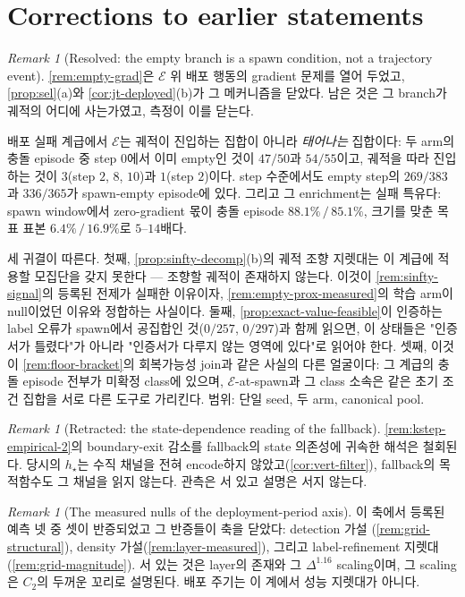 \documentclass[11pt]{article}
\theoremstyle{plain}
\theoremstyle{definition}
\theoremstyle{remark}
\newtheorem{remark}[theorem]{Remark}
\begin{document}
\section{Corrections to earlier statements}\label{sec:dt-corrections}

\begin{remark}[Resolved: the empty branch is a spawn condition, not a trajectory event]\label{rem:empty-resolved}
\cref{rem:empty-grad}은 $\mathcal E$ 위 배포 행동의 gradient 문제를 열어 두었고,
\cref{prop:sel}(a)와 \cref{cor:jt-deployed}(b)가 그 메커니즘을 닫았다. 남은 것은 그 branch가
궤적의 어디에 사는가였고, 측정이 이를 닫는다.

배포 실패 계급에서 $\mathcal E$는 궤적이 진입하는 집합이 아니라 \emph{태어나는} 집합이다: 두
arm의 충돌 episode 중 step $0$에서 이미 empty인 것이 $47/50$과 $54/55$이고, 궤적을 따라
진입하는 것이 $3$(step $2$, $8$, $10$)과 $1$(step $2$)이다. step 수준에서도 empty step의
$269/383$과 $336/365$가 spawn-empty episode에 있다. 그리고 그 enrichment는 실패 특유다:
spawn window에서 zero-gradient 몫이 충돌 episode $88.1\%\,/\,85.1\%$, 크기를 맞춘 목표 표본
$6.4\%\,/\,16.9\%$로 $5$--$14$배다.

세 귀결이 따른다. 첫째, \cref{prop:sinfty-decomp}(b)의 궤적 조향 지렛대는 이 계급에 적용할
모집단을 갖지 못한다 --- 조향할 궤적이 존재하지 않는다. 이것이 \cref{rem:sinfty-signal}의
등록된 전제가 실패한 이유이자, \cref{rem:empty-prox-measured}의 학습 arm이 null이었던 이유와
정합하는 사실이다. 둘째, \cref{prop:exact-value-feasible}이 인증하는 label 오류가 spawn에서
공집합인 것($0/257$, $0/297$)과 함께 읽으면, 이 상태들은 "인증서가 틀렸다"가 아니라
"인증서가 다루지 않는 영역에 있다"로 읽어야 한다. 셋째, 이것이 \cref{rem:floor-bracket}의
회복가능성 join과 같은 사실의 다른 얼굴이다: 그 계급의 충돌 episode 전부가 미확정 class에
있으며, $\mathcal E$-at-spawn과 그 class 소속은 같은 초기 조건 집합을 서로 다른 도구로 가리킨다.
범위: 단일 seed, 두 arm, canonical pool.
\end{remark}

\begin{remark}[Retracted: the state-dependence reading of the fallback]\label{rem:kstep-reading-retract}
\cref{rem:kstep-empirical-2}의 boundary-exit 감소를 fallback의 state 의존성에 귀속한 해석은
철회된다. 당시의 $h_\star$는 수직 채널을 전혀 encode하지 않았고(\cref{cor:vert-filter}), fallback의
목적함수도 그 채널을 읽지 않는다. 관측은 서 있고 설명은 서지 않는다.
\end{remark}

\begin{remark}[The measured nulls of the deployment-period axis]\label{rem:dt-nulls}
이 축에서 등록된 예측 넷 중 셋이 반증되었고 그 반증들이 축을 닫았다: detection 가설
(\cref{rem:grid-structural}), density 가설(\cref{rem:layer-measured}), 그리고 label-refinement
지렛대(\cref{rem:grid-magnitude}). 서 있는 것은 layer의 존재와 그 $\Delta^{1.16}$ scaling이며,
그 scaling은 $C_2$의 두꺼운 꼬리로 설명된다. 배포 주기는 이 계에서 성능 지렛대가 아니다.
\end{remark}
\end{document}
